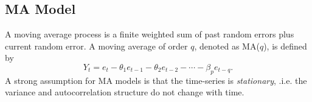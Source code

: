 \documentclass[12pt, centerh1]{article}
\begin{document}
\subsection{MA Model}
A moving average process is a finite weighted sum of past random errors plus current random error. A moving average of order $q$, denoted as MA($q$), is defined by
\begin{equation}\label{eq:MA}
    Y_t = e_t - \theta_1e_{t-1} - \theta_2e_{t-2} - \cdots - \beta_pe_{t-q}.
\end{equation}
A strong assumption for MA models is that the time-series is \textit{stationary}, .i.e. the variance and autocorrelation structure do not change with time. 
\end{document}
